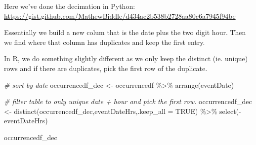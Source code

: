 \documentclass[
]{book}
\newenvironment{Shaded}{\begin{snugshade}}{\end{snugshade}}
\newcommand{\AttributeTok}[1]{\textcolor[rgb]{0.77,0.63,0.00}{#1}}
\newcommand{\CommentTok}[1]{\textcolor[rgb]{0.56,0.35,0.01}{\textit{#1}}}
\newcommand{\ConstantTok}[1]{\textcolor[rgb]{0.00,0.00,0.00}{#1}}
\newcommand{\FunctionTok}[1]{\textcolor[rgb]{0.00,0.00,0.00}{#1}}
\newcommand{\NormalTok}[1]{#1}
\newcommand{\OtherTok}[1]{\textcolor[rgb]{0.56,0.35,0.01}{#1}}
\newcommand{\SpecialCharTok}[1]{\textcolor[rgb]{0.00,0.00,0.00}{#1}}
\begin{document}
Here we've done the decimation in Python: \url{https://gist.github.com/MathewBiddle/d434ac2b538b2728aa80c6a7945f94be}

Essentially we build a new colum that is the date plus the two digit hour. Then we find where that column has duplicates and keep the first entry.

In R, we do something slightly different as we only keep the distinct (ie. unique) rows and if there are duplicates, pick the first row of the duplicate.

\begin{Shaded}
\begin{Highlighting}[]
\CommentTok{\# sort by date}
\NormalTok{occurrencedf\_dec }\OtherTok{\textless{}{-}}\NormalTok{ occurrencedf }\SpecialCharTok{\%\textgreater{}\%} \FunctionTok{arrange}\NormalTok{(eventDate)}

\CommentTok{\# filter table to only unique date + hour and pick the first row.}
\NormalTok{occurrencedf\_dec }\OtherTok{\textless{}{-}} \FunctionTok{distinct}\NormalTok{(occurrencedf\_dec,eventDateHrs,}\AttributeTok{.keep\_all =} \ConstantTok{TRUE}\NormalTok{) }\SpecialCharTok{\%\textgreater{}\%}
    \FunctionTok{select}\NormalTok{(}\SpecialCharTok{{-}}\NormalTok{eventDateHrs)}

\NormalTok{occurrencedf\_dec}
\end{Highlighting}
\end{Shaded}
\end{document}
